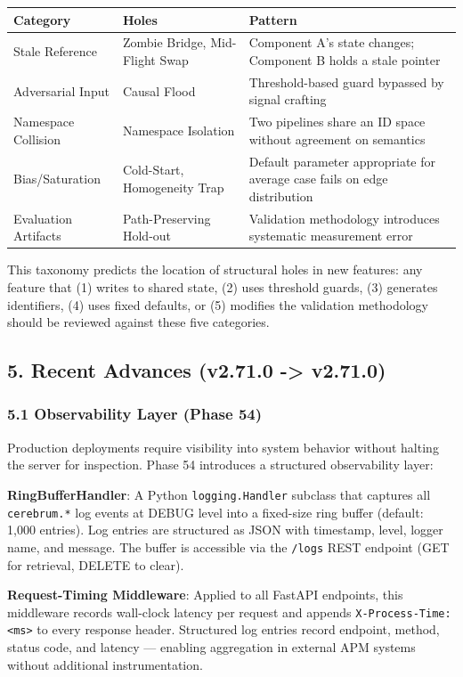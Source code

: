 \begin{table}[h]
\small\centering
\begin{tabular}{lll}
\toprule
Category & Holes & Pattern \\
\midrule
Stale Reference & Zombie Bridge, Mid-Flight Swap & Component A's state changes; Component B holds a stale pointer \\
Adversarial Input & Causal Flood & Threshold-based guard bypassed by signal crafting \\
Namespace Collision & Namespace Isolation & Two pipelines share an ID space without agreement on semantics \\
Bias/Saturation & Cold-Start, Homogeneity Trap & Default parameter appropriate for average case fails on edge distribution \\
Evaluation Artifacts & Path-Preserving Hold-out & Validation methodology introduces systematic measurement error \\
\bottomrule
\end{tabular}
\end{table}


This taxonomy predicts the location of structural holes in new features: any feature that (1) writes to shared state, (2) uses threshold guards, (3) generates identifiers, (4) uses fixed defaults, or (5) modifies the validation methodology should be reviewed against these five categories.

\subsection*{5. Recent Advances (v2.71.0 -> v2.71.0)}

\subsubsection*{5.1 Observability Layer (Phase 54)}
Production deployments require visibility into system behavior without halting the server for inspection. Phase 54 introduces a structured observability layer:

\textbf{RingBufferHandler}: A Python \texttt{logging.Handler} subclass that captures all \texttt{cerebrum.*} log events at DEBUG level into a fixed-size ring buffer (default: 1,000 entries). Log entries are structured as JSON with timestamp, level, logger name, and message. The buffer is accessible via the \texttt{/logs} REST endpoint (GET for retrieval, DELETE to clear).

\textbf{Request-Timing Middleware}: Applied to all FastAPI endpoints, this middleware records wall-clock latency per request and appends \texttt{X-Process-Time: <ms>} to every response header. Structured log entries record endpoint, method, status code, and latency --- enabling aggregation in external APM systems without additional instrumentation.


